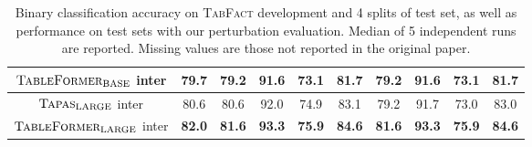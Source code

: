\documentclass[11pt]{article}
\begin{document}
\begin{table*}
\begin{tabular}{cccccc|cccc}
$\textsc{TableFormer}_{\text{BASE}}$ inter                     & \textbf{79.7} & \textbf{79.2} & \textbf{91.6} & \textbf{73.1} & \textbf{81.7}                                       & \textbf{79.2}                                       & \textbf{91.6}                                       & \textbf{73.1}                                       & \textbf{81.7} \\\midrule
$\textsc{Tapas}_{\text{LARGE}}$  inter                          & 80.6          & 80.6          & 92.0          & 74.9          & 83.1                                                & 79.2                                                & 91.7                                                & 73.0                                                & 83.0          \\
$\textsc{TableFormer}_{\text{LARGE}}$ inter                    & \textbf{82.0} & \textbf{81.6} & \textbf{93.3} & \textbf{75.9} & \textbf{84.6}                                       & \textbf{81.6}                                       & \textbf{93.3}                                       & \textbf{75.9}                                       & \textbf{84.6}
\\\bottomrule
\end{tabular}
\caption{\label{tab:widgets2}Binary classification accuracy on \textsc{TabFact} development and 4 splits of test set, as well as performance on test sets with our perturbation evaluation. Median of 5 independent runs are reported. Missing values are those not reported in the original paper.}
\end{table*}
\end{document}
